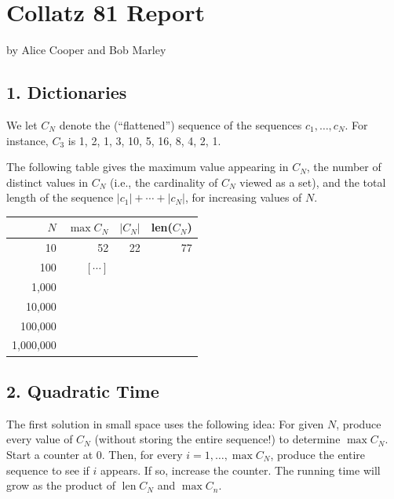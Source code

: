 \documentclass{tufte-handout}
\begin{document}
\newpage
\section{Collatz 81 Report}


by Alice Cooper and Bob Marley


\subsection{1. Dictionaries}

We let $C_N$ denote the (``flattened'') sequence of the sequences
$c_1,\ldots, c_N$. For instance, $C_3$ is 1, 2, 1, 3, 10, 5, 16, 8, 4,
2, 1.


The following table gives the maximum value appearing in $C_N$, the number
of distinct values in $C_N$ (i.e., the cardinality of $C_N$ viewed as
a set), and the total length of the sequence $|c_1|+\cdots+|c_N|$,
for increasing values of $N$.

\medskip
\begin{tabular}{rrrr}
  \toprule
  $N$ & $\max C_N$ & $|C_N|$ & len($C_N$) \\
  \midrule
  10 & 52 & 22 & 77 
  \\
  100 & $[\cdots]$ \\
  1,000 & \\
  10,000 & \\
  100,000 & \\
  1,000,000 & \\
  \bottomrule
\end{tabular}


\subsection{2. Quadratic Time}

The first solution in small space uses the following idea: For given
$N$, produce every value of $C_N$ (without storing the entire
sequence!)
to determine $\max C_N$.
Start a counter at 0.
Then, for every $i=1,\ldots, \max C_N$, produce the entire sequence to
see if $i$ appears.
If so, increase the counter.
The running time will grow as the product of $\operatorname{len}C_N$ and $ \max C_n$.
\end{document}
